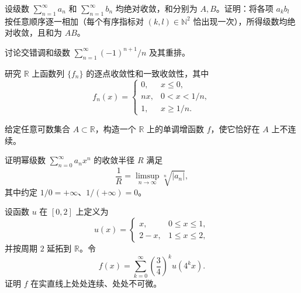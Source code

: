 \newpage
\noindent\begin{minipage}{\textwidth}
设级数 $\sum_{n=1}^{\infty}a_n$ 和 $\sum_{n=1}^{\infty}b_n$ 均绝对收敛，和分别为 $A,B$。证明：将各项 $a_kb_l$ 按任意顺序逐一相加（每个有序指标对 $(k,l)\in\mathbb N^2$ 恰出现一次），所得级数均绝对收敛，且和为 $AB$。
\end{minipage}\par\vfill
\noindent\begin{minipage}{\textwidth}
讨论交错调和级数 $\sum_{n=1}^{\infty}(-1)^{n+1}/n$ 及其重排。
\end{minipage}\par\vfill
\noindent\begin{minipage}{\textwidth}
研究 $\mathbb R$ 上函数列 $\{f_n\}$ 的逐点收敛性和一致收敛性，其中\[f_n(x)=\begin{cases}0,&x\le0,\\nx,&0<x<1/n,\\1,&x\ge1/n.\end{cases}\]
\end{minipage}\par\vfill
\noindent\begin{minipage}{\textwidth}
给定任意可数集合 $A\subset\mathbb R$，构造一个 $\mathbb R$ 上的单调增函数 $f$，使它恰好在 $A$ 上不连续。
\end{minipage}\par\vfill
\newpage
\noindent\begin{minipage}{\textwidth}
证明幂级数 $\sum_{n=0}^{\infty}a_nx^n$ 的收敛半径 $R$ 满足\[\frac1R=\limsup_{n\to\infty}\sqrt[n]{|a_n|},\]其中约定 $1/0=+\infty$、$1/(+\infty)=0$。
\end{minipage}\par\vfill
\noindent\begin{minipage}{\textwidth}
设函数 $u$ 在 $[0,2]$ 上定义为\[u(x)=\begin{cases}x,&0\le x\le1,\\2-x,&1\le x\le2,\end{cases}\]并按周期 $2$ 延拓到 $\mathbb R$。令\[f(x)=\sum_{k=0}^{\infty}\left(\frac34\right)^k u(4^kx).\]证明 $f$ 在实直线上处处连续、处处不可微。
\end{minipage}\par\vfill
